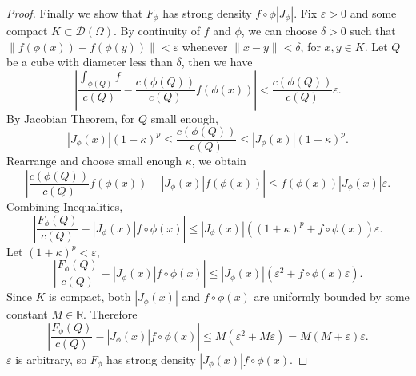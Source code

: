 \begin{proof}
	Finally we show that $F_ \phi$ has strong density $f \circ \phi |J_ \phi|$. Fix $\varepsilon>0$ and some compact $K \subset \mathcal{D}(\Omega)$.
	By continuity of $f$ and $\phi$, we can choose $\delta>0$ such that  $\|f (\phi(x)) - f(\phi(y))\| < \varepsilon$ whenever $\|x - y\| < \delta$, for $x, y \in K$. Let $Q$ be a cube with diameter less than $\delta$, then we have
	\[
		\left| \frac{\int _{\phi (Q)} f}{c(Q)} - \frac{c(\phi(Q))}{c(Q)}f(\phi(x)) \right|  < \frac{c(\phi(Q))}{c(Q)} \varepsilon
	.\] 
	By Jacobian Theorem, for $Q$ small enough,
	\[
		|J_ \phi(x)| (1 - \kappa)^p \le  \frac{c(\phi(Q))}{c(Q)}  \le  |J_ \phi(x)| (1 + \kappa)^p 
	.\] 
	Rearrange and choose small enough $\kappa$, we obtain
	\[
		\left| \frac{c(\phi(Q))}{c(Q)}f(\phi(x)) - |J_ \phi(x)| f( \phi(x)) \right|  \le  f(\phi(x)) |J_{\phi}(x)| \varepsilon
	.\] 
	Combining Inequalities,
	\[
		\left| \frac{F_ \phi (Q)}{c(Q)} - |J_ \phi(x)| f \circ \phi(x)\right| \le \left| J_ \phi(x) \right|\left( (1 + \kappa)^p + f \circ \phi(x)\right) \varepsilon
	.\] 
	Let $(1 + \kappa)^p < \varepsilon$,
\[
		\left| \frac{F_ \phi (Q)}{c(Q)} - |J_ \phi(x)| f \circ \phi(x)\right| \le \left| J_ \phi(x) \right|\left(\varepsilon^2 + f \circ \phi(x) \varepsilon\right)
	.\]
	Since $K$ is compact, both $\left| J_ \phi(x) \right|  $ and $f \circ \phi (x)$ are uniformly bounded by some constant $M \in \mathbb{R}$. Therefore
\[
		\left| \frac{F_ \phi (Q)}{c(Q)} - |J_ \phi(x)| f \circ \phi(x)\right| \le M \left(\varepsilon^2 + M \varepsilon\right) = M(M + \varepsilon) \varepsilon
	.\]
	$\varepsilon$ is arbitrary, so $F_ \phi$ has strong density $\left| J_ \phi(x)\right| f \circ \phi(x)  $.
\end{proof}
